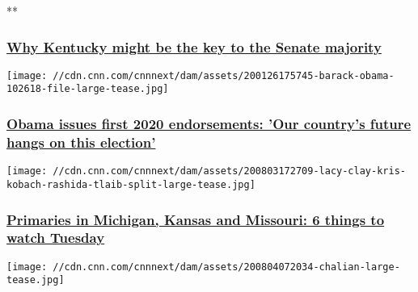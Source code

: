 **

\hypertarget{why-kentucky-might-be-the-key-to-the-senate-majority}{%
\subsubsection{\texorpdfstring{\href{/videos/politics/2020/08/04/amy-mcgrath-mitch-mcconell-kentucky-senate-cillizza-the-point.cnn}{Why
Kentucky might be the key to the Senate
majority}}{Why Kentucky might be the key to the Senate majority}}\label{why-kentucky-might-be-the-key-to-the-senate-majority}}

\href{/2020/08/03/politics/barack-obama-first-2020-endorsements/index.html}{}

\texttt{[image: //cdn.cnn.com/cnnnext/dam/assets/200126175745-barack-obama-102618-file-large-tease.jpg]}

\hypertarget{obama-issues-first-2020-endorsements-our-countrys-future-hangs-on-this-election}{%
\subsubsection{\texorpdfstring{\href{/2020/08/03/politics/barack-obama-first-2020-endorsements/index.html}{Obama
issues first 2020 endorsements: 'Our country's future hangs on this
election'}}{Obama issues first 2020 endorsements: 'Our country's future hangs on this election'}}\label{obama-issues-first-2020-endorsements-our-countrys-future-hangs-on-this-election}}

\href{/2020/08/04/politics/primary-elections-michigan-kansas-missouri/index.html}{}

\texttt{[image: //cdn.cnn.com/cnnnext/dam/assets/200803172709-lacy-clay-kris-kobach-rashida-tlaib-split-large-tease.jpg]}

\hypertarget{primaries-in-michigan-kansas-and-missouri-6-things-to-watch-tuesday}{%
\subsubsection{\texorpdfstring{\href{/2020/08/04/politics/primary-elections-michigan-kansas-missouri/index.html}{Primaries
in Michigan, Kansas and Missouri: 6 things to watch
Tuesday}}{Primaries in Michigan, Kansas and Missouri: 6 things to watch Tuesday}}\label{primaries-in-michigan-kansas-and-missouri-6-things-to-watch-tuesday}}

\href{/videos/politics/2020/08/04/donald-trump-john-lewis-axios-chalian-newday-vpx.cnn}{}

\texttt{[image: //cdn.cnn.com/cnnnext/dam/assets/200804072034-chalian-large-tease.jpg]}

